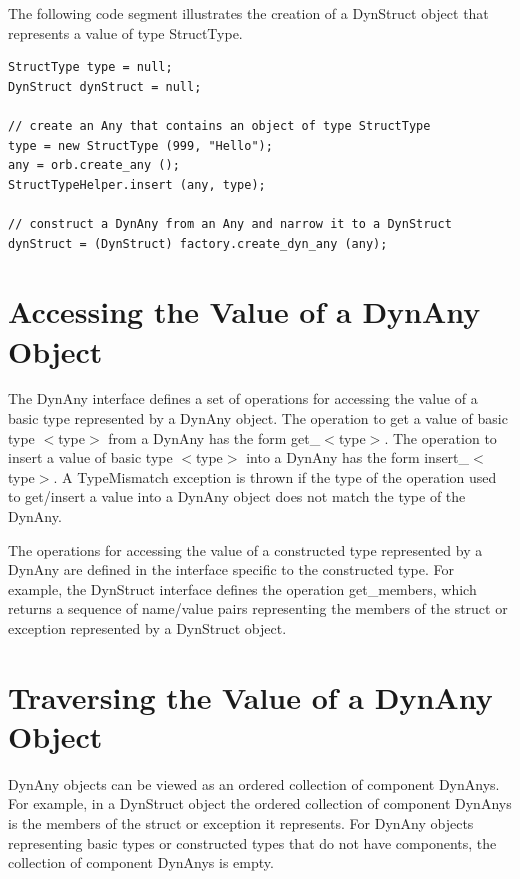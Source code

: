 The following code segment illustrates the creation of a DynStruct
object that represents a value of type StructType.

\begin{small}
\begin{verbatim}
StructType type = null;
DynStruct dynStruct = null;

// create an Any that contains an object of type StructType
type = new StructType (999, "Hello");
any = orb.create_any ();
StructTypeHelper.insert (any, type);

// construct a DynAny from an Any and narrow it to a DynStruct
dynStruct = (DynStruct) factory.create_dyn_any (any);

\end{verbatim}
\end{small}

\section{Accessing the Value of a DynAny Object}

The DynAny interface defines a set of operations for accessing the
value of a basic type represented by a DynAny object.  The operation
to get a value of basic type $<$type$>$ from a DynAny has the form
get\_$<$type$>$.  The operation to insert a value of basic type
$<$type$>$ into a DynAny has the form insert\_$<$type$>$.  A
TypeMismatch exception is thrown if the type of the operation used to
get/insert a value into a DynAny object does not match the type of
the DynAny.

The operations for accessing the value of a constructed type
represented by a DynAny are defined in the interface specific to the
constructed type.  For example, the DynStruct interface defines the
operation get\_members, which returns a sequence of name/value pairs
representing the members of the struct or exception represented by a
DynStruct object.

\section{Traversing the Value of a DynAny Object}

DynAny objects can be viewed as an ordered collection of component
DynAnys.  For example, in a DynStruct object the ordered collection
of component DynAnys is the members of the struct or exception it
represents.  For DynAny objects representing basic types or
constructed types that do not have components, the collection of
component DynAnys is empty.

